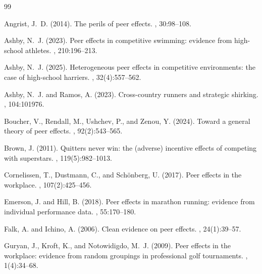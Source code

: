 \documentclass[12pt]{article}
\theoremstyle{definition}
\theoremstyle{remark}
\begin{document}
\clearpage

\begin{thebibliography}{99}

Angrist, J.~D. (2014).
\newblock The perils of peer effects.
, 30:98--108.

Ashby, N.~J. (2023).
\newblock Peer effects in competitive swimming: evidence from high-school athletes.
, 210:196--213.

Ashby, N.~J. (2025).
\newblock Heterogeneous peer effects in competitive environments: the case of high-school harriers.
, 32(4):557--562.

Ashby, N.~J. and Ramos, A. (2023).
\newblock Cross-country runners and strategic shirking.
, 104:101976.

Boucher, V., Rendall, M., Ushchev, P., and Zenou, Y. (2024).
\newblock Toward a general theory of peer effects.
, 92(2):543--565.

Brown, J. (2011).
\newblock Quitters never win: the (adverse) incentive effects of competing with superstars.
, 119(5):982--1013.

Cornelissen, T., Dustmann, C., and Sch\"{o}nberg, U. (2017).
\newblock Peer effects in the workplace.
, 107(2):425--456.

Emerson, J. and Hill, B. (2018).
\newblock Peer effects in marathon running: evidence from individual performance data.
, 55:170--180.

Falk, A. and Ichino, A. (2006).
\newblock Clean evidence on peer effects.
, 24(1):39--57.

Guryan, J., Kroft, K., and Notowidigdo, M.~J. (2009).
\newblock Peer effects in the workplace: evidence from random groupings in professional golf tournaments.
, 1(4):34--68.


\end{thebibliography}
\end{document}
